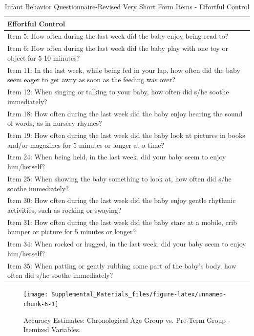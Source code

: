 \documentclass[
]{article}
\begin{document}
\pagebreak
\begin{table}

\caption{\label{tab:unnamed-chunk-5}Infant Behavior Questionnaire-Revised Very Short Form Items - Effortful Control}
\fontsize{12}{14}\selectfont
\begin{tabular}[t]{>{\raggedright\arraybackslash}p{40em}}
\hline
\textbf{Effortful Control}\\
\hline
Item 5: How often during the last week did the baby enjoy being read to?\\
\hline
Item 6: How often during the last week did the baby play with one toy or object for 5-10 minutes?\\
\hline
Item 11: In the last week, while being fed in your lap, how often did the baby seem eager to get away as soon as the feeding was over?\\
\hline
Item 12: When singing or talking to your baby, how often did s/he soothe immediately?\\
\hline
Item 18: How often during the last week did the baby enjoy hearing the sound of words, as in nursery rhymes?\\
\hline
Item 19: How often during the last week did the baby look at pictures in books and/or magazines for 5 minutes or longer at a time?\\
\hline
Item 24: When being held, in the last week, did your baby seem to enjoy him/herself?\\
\hline
Item 25: When showing the baby something to look at, how often did s/he soothe immediately?\\
\hline
Item 30: How often during the last week did the baby enjoy gentle rhythmic activities, such as rocking or swaying?\\
\hline
Item 31: How often during the last week did the baby stare at a mobile, crib bumper or picture for 5 minutes or longer?\\
\hline
Item 34: When rocked or hugged, in the last week, did your baby seem to enjoy him/herself?\\
\hline
Item 35: When patting or gently rubbing some part of the baby’s body, how often did s/he soothe immediately?\\
\hline
\end{tabular}
\end{table}

\newpage

\begin{figure}

{\centering \texttt{[image: Supplemental\_Materials\_files/figure-latex/unnamed-chunk-6-1]} 

}

\caption{Accuracy Estimates: Chronological Age Group vs. Pre-Term Group - Itemized Variables.}\label{fig:unnamed-chunk-6}
\end{figure}
\newpage
\end{document}
